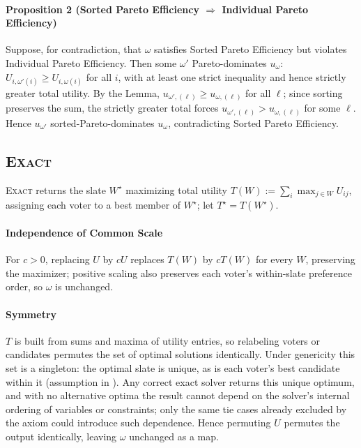 \documentclass[11pt]{article}
\newcommand{\Exact}{\textsc{Exact}}
\begin{document}
\paragraph{Proposition 2 (Sorted Pareto Efficiency $\Rightarrow$ Individual Pareto Efficiency)} Suppose, for contradiction, that $\omega$ satisfies Sorted Pareto Efficiency but violates Individual Pareto Efficiency. Then some $\omega'$ Pareto-dominates $u_\omega$: $U_{i,\omega'(i)}\ge U_{i,\omega(i)}$ for all $i$, with at least one strict inequality and hence strictly greater total utility. By the Lemma, $u_{\omega',(\ell)}\ge u_{\omega,(\ell)}$ for all $\ell$; since sorting preserves the sum, the strictly greater total forces $u_{\omega',(\ell)}>u_{\omega,(\ell)}$ for some $\ell$. Hence $u_{\omega'}$ sorted-Pareto-dominates $u_\omega$, contradicting Sorted Pareto Efficiency.

\subsection{\Exact{}} \label{app:exact-axiom-proofs}
\Exact{} returns the slate $W^\star$ maximizing total utility $T(W):=\sum_i\max_{j\in W}U_{ij}$, assigning each voter to a best member of $W^\star$; let $T^\star=T(W^\star)$.

\paragraph{Independence of Common Scale} For $c>0$, replacing $U$ by $cU$ replaces $T(W)$ by $cT(W)$ for every $W$, preserving the maximizer; positive scaling also preserves each voter's within-slate preference order, so $\omega$ is unchanged.

\paragraph{Symmetry} $T$ is built from sums and maxima of utility entries, so relabeling voters or candidates permutes the set of optimal solutions identically. Under genericity this set is a singleton: the optimal slate is unique, as is each voter's best candidate within it (assumption in ). Any correct exact solver returns this unique optimum, and with no alternative optima the result cannot depend on the solver's internal ordering of variables or constraints; only the same tie cases already excluded by the axiom could introduce such dependence. Hence permuting $U$ permutes the output identically, leaving $\omega$ unchanged as a map.
\end{document}
